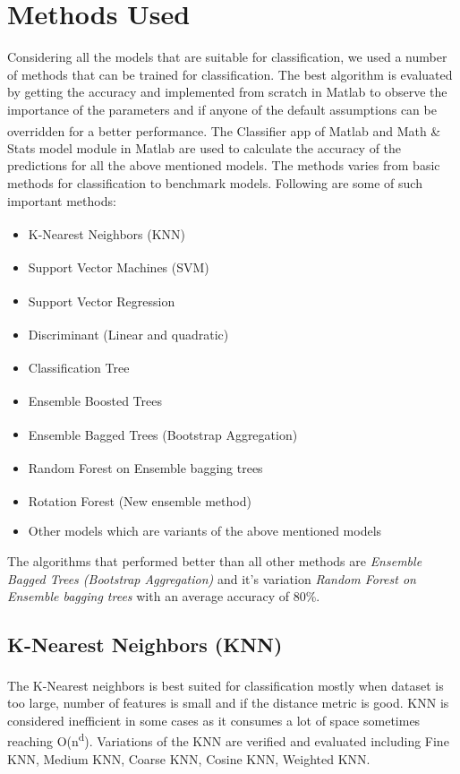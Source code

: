 \documentclass[journal, a4paper]{IEEEtran}
\begin{document}
\section{Methods Used}
Considering all the models that are suitable for classification, we used a number of methods that can be trained for classification. The best algorithm is evaluated by getting the accuracy and implemented from scratch in Matlab to observe the importance of the parameters and if anyone of the default assumptions can be overridden for a better performance. The Classifier app\textsuperscript{\cite{classifier}} of Matlab and Math \& Stats model module in Matlab are used to calculate the accuracy of the predictions for all the above mentioned models. The methods varies from basic methods for classification to benchmark models. Following are some of such important methods:
\begin{itemize}
\item K-Nearest Neighbors (KNN) \textsuperscript{\cite{KNN}}
\item Support Vector Machines (SVM)\textsuperscript{\cite{libSVM}}
\item Support Vector Regression \textsuperscript{\cite{SVR}}
\item Discriminant (Linear and quadratic)\textsuperscript{\cite{lda}}
\item Classification Tree\textsuperscript{\cite{ctree}}
\item Ensemble Boosted Trees\textsuperscript{\cite{BoostedTrees}}
\item Ensemble Bagged Trees (Bootstrap Aggregation)\textsuperscript{\cite{bootstrapAggregation}}
\item Random Forest on Ensemble bagging trees\textsuperscript{\cite{randomForest}}
\item Rotation Forest\textsuperscript{\cite{rotationForest}} (New ensemble method)
\item Other models which are variants of the above mentioned models
\end{itemize}

\indent The algorithms that performed better than all other methods are \textit{Ensemble Bagged Trees (Bootstrap Aggregation)} and it's variation \textit{Random Forest on Ensemble bagging trees} with an average accuracy of 80\%.
\subsection{K-Nearest Neighbors (KNN)}
The K-Nearest neighbors\textsuperscript{\cite{KNN}} is best suited for classification mostly when dataset is too large, number of features is small and if the distance metric is good. KNN is considered inefficient in some cases as it consumes a lot of space sometimes reaching O(n\textsuperscript{d}). Variations of the KNN are verified and evaluated including Fine KNN, Medium KNN, Coarse KNN, Cosine KNN, Weighted KNN. 
\end{document}
